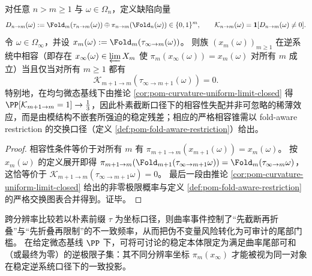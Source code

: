 \begin{proposition}\label{prop:pom-identity-cone-requires-curvature-reduction}
对任意 \(n>m\ge 1\) 与 \(\omega\in\Omega_n\)，定义缺陷向量
\[
D_{n\to m}(\omega):=\Fold_m(\tau_{n\to m}(\omega))\oplus \pi_{n\to m}(\Fold_n(\omega))\in\{0,1\}^m,
\qquad
\mathcal K_{n\to m}(\omega)=\mathbf 1[D_{n\to m}(\omega)\neq 0].
\]
令 \(\omega\in\Omega_\infty\)，并设 \(x_m(\omega):=\Fold_m(\tau_{\infty\to m}(\omega))\)。
则族 \((x_m(\omega))_{m\ge 1}\) 在逆系统中相容（即存在 \(x_\infty(\omega)\in\varprojlim X_m\) 使 \(\pi_m(x_\infty(\omega))=x_m(\omega)\) 对所有 \(m\) 成立）当且仅当对所有 \(m\ge 1\) 都有
\[
\mathcal K_{m+1\to m}(\tau_{\infty\to m+1}(\omega))=0.
\]
特别地，在均匀微态基线下由推论 \ref{cor:pom-curvature-uniform-limit-closed} 得 \(\PP[\mathcal K_{m+1\to m}=1]\to\tfrac13\)，因此朴素截断口径下的相容性失配并非可忽略的稀薄效应，而是由模结构不嵌套所强迫的稳定残差；相应的严格相容锥需以 fold-aware restriction 的交换口径（定义 \ref{def:pom-fold-aware-restriction}）给出。
\end{proposition}
\begin{proof}
相容性条件等价于对所有 \(m\) 有 \(\pi_{m+1\to m}(x_{m+1}(\omega))=x_m(\omega)\)。
按 \(x_m(\omega)\) 的定义展开即得
\(
\pi_{m+1\to m}(\Fold_{m+1}(\tau_{\infty\to m+1}\omega))=\Fold_m(\tau_{\infty\to m}\omega)
\)，这恰等价于 \(\mathcal K_{m+1\to m}(\tau_{\infty\to m+1}\omega)=0\)。
最后一段由推论 \ref{cor:pom-curvature-uniform-limit-closed} 给出的非零极限概率与定义 \ref{def:pom-fold-aware-restriction} 的严格交换图表合并得到。证毕。
\end{proof}

\begin{remark}[曲率尾部门槛与逆极限粒子化判据]\label{rem:pom-curvature-particleization}
跨分辨率比较若以朴素前缀 $\tau$ 为坐标口径，则曲率事件控制了“先截断再折叠”与“先折叠再限制”的不一致频率，从而把伪不变量风险转化为可审计的尾部门槛。
在给定微态基线 $\PP$ 下，可将可讨论的稳定本体限定为满足曲率尾部可和（或最终为零）的逆极限子集：其不同分辨率坐标 $\pi_m(x_\infty)$ 才能被视为同一对象在稳定逆系统口径下的一致投影。
\end{remark}

